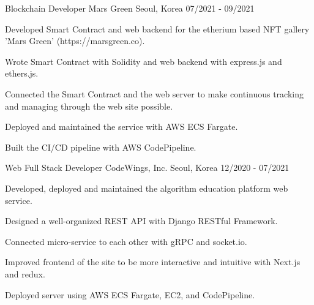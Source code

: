 \cventry
{Blockchain Developer} %
{Mars Green} %
{Seoul, Korea} %
{07/2021 - 09/2021} %
\begin{cvitems}
\item {Developed Smart Contract and web backend for the etherium based NFT gallery 'Mars Green' (https://marsgreen.co).}
\item {Wrote Smart Contract with Solidity and web backend with express.js and ethers.js.}
\item {Connected the Smart Contract and the web server to make continuous tracking and managing through the web site possible.}
\item {Deployed and maintained the service with AWS ECS Fargate.}
\item {Built the CI/CD pipeline with AWS CodePipeline.}
\end{cvitems}

\cventry
{Web Full Stack Developer} %
{CodeWings, Inc.} %
{Seoul, Korea} %
{12/2020 - 07/2021} %
\begin{cvitems}
\item {Developed, deployed and maintained the algorithm education platform web service.}
\item {Designed a well-organized REST API with Django RESTful Framework.}
\item {Connected micro-service to each other with gRPC and socket.io.}
\item {Improved frontend of the site to be more interactive and intuitive with Next.js and redux.}
\item {Deployed server using AWS ECS Fargate, EC2, and CodePipeline.}
\end{cvitems}
